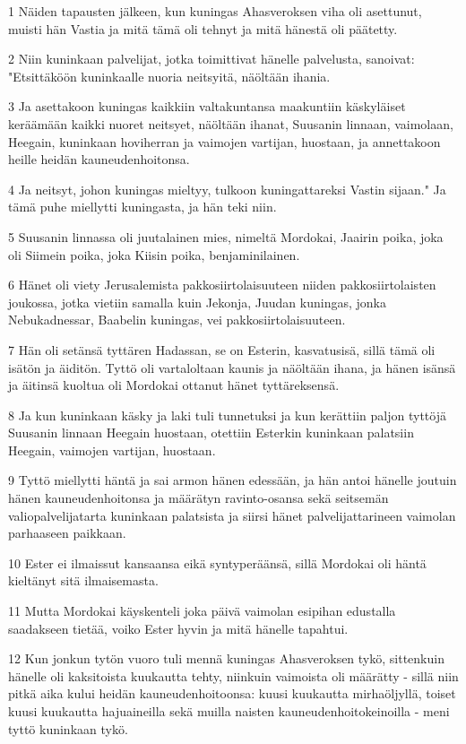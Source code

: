 \par 1 Näiden tapausten jälkeen, kun kuningas Ahasveroksen viha oli asettunut, muisti hän Vastia ja mitä tämä oli tehnyt ja mitä hänestä oli päätetty.
\par 2 Niin kuninkaan palvelijat, jotka toimittivat hänelle palvelusta, sanoivat: "Etsittäköön kuninkaalle nuoria neitsyitä, näöltään ihania.
\par 3 Ja asettakoon kuningas kaikkiin valtakuntansa maakuntiin käskyläiset keräämään kaikki nuoret neitsyet, näöltään ihanat, Suusanin linnaan, vaimolaan, Heegain, kuninkaan hoviherran ja vaimojen vartijan, huostaan, ja annettakoon heille heidän kauneudenhoitonsa.
\par 4 Ja neitsyt, johon kuningas mieltyy, tulkoon kuningattareksi Vastin sijaan." Ja tämä puhe miellytti kuningasta, ja hän teki niin.
\par 5 Suusanin linnassa oli juutalainen mies, nimeltä Mordokai, Jaairin poika, joka oli Siimein poika, joka Kiisin poika, benjaminilainen.
\par 6 Hänet oli viety Jerusalemista pakkosiirtolaisuuteen niiden pakkosiirtolaisten joukossa, jotka vietiin samalla kuin Jekonja, Juudan kuningas, jonka Nebukadnessar, Baabelin kuningas, vei pakkosiirtolaisuuteen.
\par 7 Hän oli setänsä tyttären Hadassan, se on Esterin, kasvatusisä, sillä tämä oli isätön ja äiditön. Tyttö oli vartaloltaan kaunis ja näöltään ihana, ja hänen isänsä ja äitinsä kuoltua oli Mordokai ottanut hänet tyttäreksensä.
\par 8 Ja kun kuninkaan käsky ja laki tuli tunnetuksi ja kun kerättiin paljon tyttöjä Suusanin linnaan Heegain huostaan, otettiin Esterkin kuninkaan palatsiin Heegain, vaimojen vartijan, huostaan.
\par 9 Tyttö miellytti häntä ja sai armon hänen edessään, ja hän antoi hänelle joutuin hänen kauneudenhoitonsa ja määrätyn ravinto-osansa sekä seitsemän valiopalvelijatarta kuninkaan palatsista ja siirsi hänet palvelijattarineen vaimolan parhaaseen paikkaan.
\par 10 Ester ei ilmaissut kansaansa eikä syntyperäänsä, sillä Mordokai oli häntä kieltänyt sitä ilmaisemasta.
\par 11 Mutta Mordokai käyskenteli joka päivä vaimolan esipihan edustalla saadakseen tietää, voiko Ester hyvin ja mitä hänelle tapahtui.
\par 12 Kun jonkun tytön vuoro tuli mennä kuningas Ahasveroksen tykö, sittenkuin hänelle oli kaksitoista kuukautta tehty, niinkuin vaimoista oli määrätty - sillä niin pitkä aika kului heidän kauneudenhoitoonsa: kuusi kuukautta mirhaöljyllä, toiset kuusi kuukautta hajuaineilla sekä muilla naisten kauneudenhoitokeinoilla - meni tyttö kuninkaan tykö.
